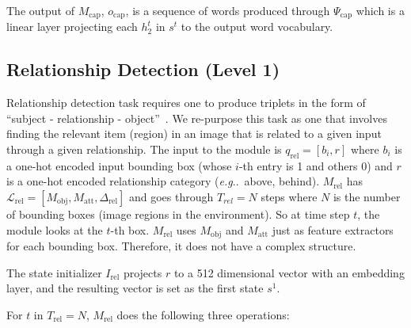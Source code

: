 \documentclass{article}
\makeatletter
\def\Mobj{M_\mathrm{obj}}
\def\Matt{M_\mathrm{att}}
\def\Mrel{M_\mathrm{rel}}
\def\Mcap{M_\mathrm{cap}}
\DeclareRobustCommand\onedot{\futurelet\@let@token\@onedot}
\def\@onedot{\ifx\@let@token.\else.\null\fi\xspace}
\def\eg{\emph{e.g}\onedot} \def\Eg{\emph{E.g}\onedot}
\makeatother
\begin{document}
The output of $\Mcap$, $o_\mathrm{cap}$, is a sequence of words produced through $\Psi_\mathrm{cap}$ which is a linear layer projecting each $h^t_2$ in $s^t$ to the output word vocabulary.

\subsection{Relationship Detection (Level 1)}
Relationship detection task requires one to produce triplets in the form of ``subject - relationship - object''~\citep{lu2016visual}.
We re-purpose this task as one that involves finding the relevant item (region) in an image that is related to a given input through a given relationship.
The input to the module is $q_\mathrm{rel}=[b_i, r]$ where $b_i$ is a one-hot encoded input bounding box (whose $i$-th entry is 1 and others 0) and $r$ is a one-hot encoded relationship category (\eg~above, behind).
$\Mrel$ has $\mathcal L_\mathrm{rel} = [\Mobj, \Matt, \Delta_{\mathrm{rel}}]$ and goes through $T_{rel}=N$ steps where $N$ is the number of bounding boxes (image regions in the environment).
So at time step $t$, the module looks at the $t$-th box.
$\Mrel$ uses $\Mobj$ and $\Matt$ just as feature extractors for each bounding box.
Therefore, it does not have a complex structure.

The state initializer $I_\mathrm{rel}$ projects $r$ to a 512 dimensional vector with an embedding layer, and the resulting vector is set as the first state $s^1$.

For $t$ in $T_{\mathrm{rel}}=N$, $M_\mathrm{rel}$ does the following three operations:
\end{document}
